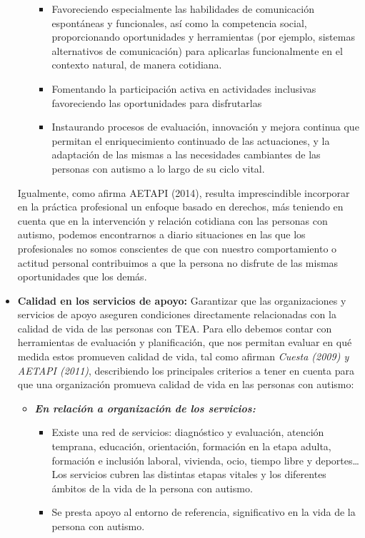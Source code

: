 \begin{itemize}
\begin{itemize}
\begin{itemize}
			\item Favoreciendo especialmente las habilidades de comunicación espontáneas y funcionales, así como la competencia social, proporcionando oportunidades y herramientas (por ejemplo, sistemas alternativos de comunicación) para aplicarlas funcionalmente en el contexto natural, de manera cotidiana. 
			\item Fomentando la participación activa en actividades inclusivas favoreciendo las oportunidades para disfrutarlas  
			\item Instaurando procesos de evaluación, innovación y mejora continua que permitan el enriquecimiento continuado de las actuaciones, y la adaptación de las mismas a las necesidades cambiantes de las personas con autismo a lo largo de su ciclo vital.
		\end{itemize}
	\end{itemize}
	Igualmente, como afirma AETAPI (2014), resulta imprescindible incorporar en la práctica profesional un enfoque basado en derechos, más teniendo en cuenta que en la intervención y relación cotidiana con las personas con autismo, podemos encontrarnos a diario situaciones en las que los profesionales no somos conscientes de que con nuestro comportamiento o actitud personal contribuimos a que la persona no disfrute de las mismas oportunidades que los demás.
	\item \textbf{Calidad en los servicios de apoyo: }Garantizar que las
	organizaciones y servicios de apoyo aseguren condiciones directamente
	relacionadas con la calidad de vida de las personas con TEA. Para ello
	debemos contar con herramientas de evaluación y planificación, que nos
	permitan evaluar en qué medida estos promueven calidad de vida, tal como
	afirman \textit{Cuesta (2009) y AETAPI (2011)}, describiendo los principales
	criterios a tener en cuenta para que una organización promueva calidad de
	vida en las personas con autismo: 
	\begin{itemize}
		\item \textbf{\textit{En relación a organización de los servicios:}} 
		\begin{itemize}
			\item Existe una red de servicios: diagnóstico y evaluación, atención temprana, educación, orientación, formación en la etapa adulta, formación e inclusión laboral, vivienda, ocio, tiempo libre y deportes…Los servicios cubren las distintas etapas vitales y los diferentes ámbitos de la vida de la persona con autismo.  
			\item Se presta apoyo al entorno de referencia, significativo en la vida de la persona con autismo. 

\end{itemize}
\end{itemize}
\end{itemize}
